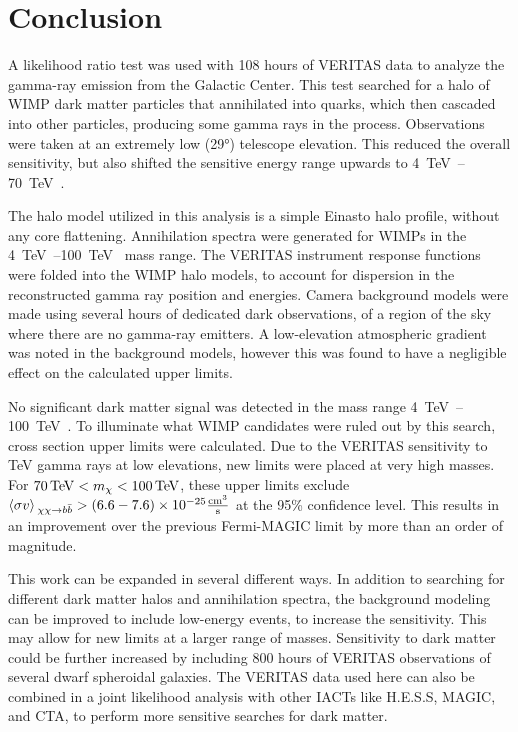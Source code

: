 \cleartooddpage[\thispagestyle{empty}]
\chapter{Conclusion}

A likelihood ratio test was used with 108 hours of VERITAS data to analyze the gamma-ray emission from the Galactic Center.
This test searched for a halo of WIMP dark matter particles that annihilated into \bbbar quarks, which then cascaded into other particles, producing some gamma rays in the process.
Observations were taken at an extremely low (\nicetilde{}\ang{29}) telescope elevation.
This reduced the overall sensitivity, but also shifted the sensitive energy range upwards to \SIrange{4}{70}{\TeV{}}.

The halo model utilized in this analysis is a simple Einasto halo profile, without any core flattening.
Annihilation spectra were generated for WIMPs in the \SIrange{4}{100}{\TeV{}} mass range.
The VERITAS instrument response functions were folded into the WIMP halo models, to account for dispersion in the reconstructed gamma ray position and energies.
Camera background models were made using several hours of dedicated dark observations, of a region of the sky where there are no gamma-ray emitters.
A low-elevation atmospheric gradient was noted in the background models, however this was found to have a negligible effect on the calculated upper limits.

No significant dark matter signal was detected in the mass range \SIrange{4}{100}{\TeV{}}.
To illuminate what WIMP candidates were ruled out by this search, cross section upper limits were calculated.
Due to the VERITAS sensitivity to TeV gamma rays at low elevations, new limits were placed at very high masses.
For $70\,\TeV<m_{\chi}<100\,\TeV$, these upper limits exclude ${\left \langle \sigma v \right \rangle{}_{\chi\chi\rightarrow b\bar{b}} > \left ( 6.6-7.6 \right ) \times 10^{-25} \frac{\mathrm{cm}^3}{\mathrm{s}}}$ at the 95\% confidence level.
This results in an improvement over the previous Fermi-MAGIC limit by more than an order of magnitude.

This work can be expanded in several different ways.
In addition to searching for different dark matter halos and annihilation spectra, the background modeling can be improved to include low-energy events, to increase the sensitivity.
This may allow for new limits at a larger range of masses.
Sensitivity to dark matter could be further increased by including \nicetilde{}800 hours of VERITAS observations of several dwarf spheroidal galaxies.
The VERITAS data used here can also be combined in a joint likelihood analysis with other IACTs like H.E.S.S, MAGIC, and CTA, to perform more sensitive searches for dark matter.


